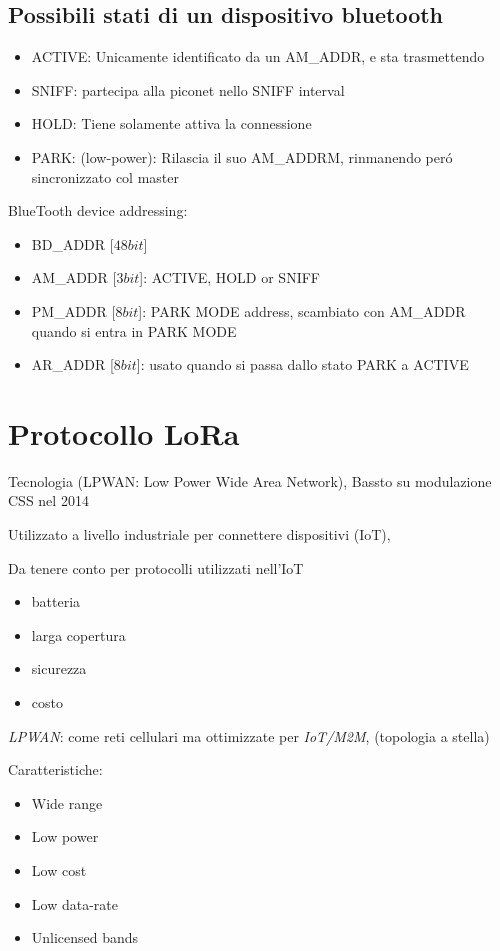 \documentclass{article}
\begin{document}
\subsection{Possibili stati di un dispositivo bluetooth}
\begin{itemize}
    \item ACTIVE:  Unicamente identificato da un AM\_ADDR, e sta trasmettendo
    \item SNIFF: partecipa alla piconet nello SNIFF interval
    \item HOLD: Tiene solamente attiva la connessione
    \item PARK: (low-power): Rilascia il suo AM\_ADDRM, rinmanendo per\'o sincronizzato col master
\end{itemize}

BlueTooth device addressing:
\begin{itemize}
    \item BD\_ADDR [$48 bit$]
    \item AM\_ADDR [$3 bit$]: ACTIVE, HOLD or SNIFF
    \item PM\_ADDR [$8 bit$]: PARK MODE address, scambiato con AM\_ADDR quando si entra in PARK MODE
    \item AR\_ADDR [$8 bit$]: usato quando si passa dallo stato PARK a ACTIVE
\end{itemize}

\section{Protocollo LoRa}
Tecnologia (LPWAN: Low Power Wide Area Network), Bassto su modulazione CSS nel 2014

Utilizzato a livello industriale per connettere dispositivi (IoT),

Da tenere conto per protocolli utilizzati nell'IoT
\begin{itemize}
    \item batteria
    \item larga copertura
    \item sicurezza
    \item costo
\end{itemize}

\textit{LPWAN}: come reti cellulari ma ottimizzate per \textit{IoT/M2M}, (topologia a stella)

Caratteristiche:
\begin{itemize}
    \item Wide range
    \item Low power
    \item Low cost
    \item Low data-rate
    \item Unlicensed bands
\end{itemize}
\end{document}
